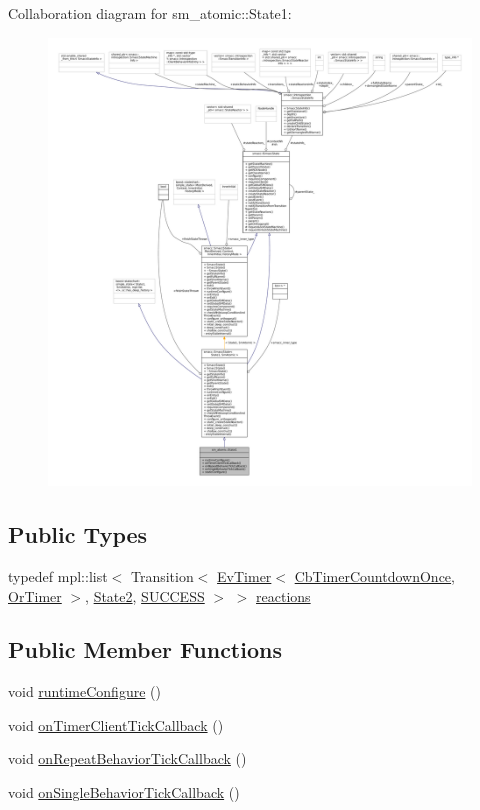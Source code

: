 Collaboration diagram for sm\+\_\+atomic\+:\+:State1\+:
\nopagebreak
\begin{figure}[H]
\begin{center}
\leavevmode
\includegraphics[width=350pt]{structsm__atomic_1_1State1__coll__graph}
\end{center}
\end{figure}
\subsection*{Public Types}
\begin{DoxyCompactItemize}
\item 
typedef mpl\+::list$<$ Transition$<$ \hyperlink{structcl__ros__timer__client_1_1EvTimer}{Ev\+Timer}$<$ \hyperlink{classcl__ros__timer__client_1_1CbTimerCountdownOnce}{Cb\+Timer\+Countdown\+Once}, \hyperlink{classsm__atomic_1_1OrTimer}{Or\+Timer} $>$, \hyperlink{structsm__atomic_1_1State2}{State2}, \hyperlink{structsmacc_1_1default__transition__tags_1_1SUCCESS}{S\+U\+C\+C\+E\+SS} $>$ $>$ \hyperlink{structsm__atomic_1_1State1_ab05a524c2d0d99c2ca7c4174d49de73c}{reactions}
\end{DoxyCompactItemize}
\subsection*{Public Member Functions}
\begin{DoxyCompactItemize}
\item 
void \hyperlink{structsm__atomic_1_1State1_a47c2e651bb707f14d9b32f92c44f8ebc}{runtime\+Configure} ()
\item 
void \hyperlink{structsm__atomic_1_1State1_adea28f0a0fcedb210a29656f53aeee09}{on\+Timer\+Client\+Tick\+Callback} ()
\item 
void \hyperlink{structsm__atomic_1_1State1_a9d2c943f02a8e0f1d7b86132ada1c6e0}{on\+Repeat\+Behavior\+Tick\+Callback} ()
\item 
void \hyperlink{structsm__atomic_1_1State1_a9cb95d91cf5a22f0d9d079dc04bf58aa}{on\+Single\+Behavior\+Tick\+Callback} ()
\end{DoxyCompactItemize}

